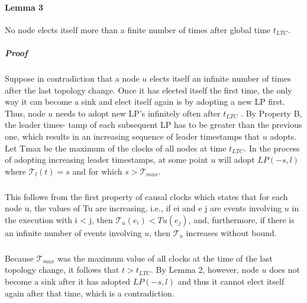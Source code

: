 \paragraph{Lemma 3}No node elects itself more than a finite number of times after global time $t_{LTC}$.
\subparagraph{Proof}Suppose in contradiction that a node $u$ elects itself an infinite number of times after the last topology change. Once it has elected itself the first time, the only way it can become a sink and elect itself again is by adopting a new LP first. Thus, node $u$ needs to adopt new LP's infinitely often after $t_{LTC}$ . By Property B, the leader times- tamp of each subsequent LP has to be greater than the previous one, which results in an increasing sequence of leader timestamps that $u$ adopts. Let Tmax be the maximum of the clocks of all nodes at time $t_{LTC}$. In the process of adopting increasing leader timestamps, at some point $u$ will adopt $LP(-s, l)$ where $\mathcal{T} _l (t) = s$ and for which $s > \mathcal{T} _{max}$.
\subparagraph{}This follows from the first property of causal clocks which states that for each node u, the values of Tu are increasing, i.e., if ei and e j are events involving $u$ in the execution with i < j, then $\mathcal{T} _u (e_i ) < Tu (e_j )$, and, furthermore, if there is an infinite number of events involving $u$, then $\mathcal{T} _u$ increases without bound. 
\subparagraph{}Because $\mathcal{T} _{max}$ was the maximum value of all clocks at the time of the last topology change, it follows that $t > t_{LTC}$. By Lemma 2, however, node $u$ does not become a sink after it has adopted $LP(-s, l)$ and thus it cannot elect itself again after that time, which is a contradiction.
